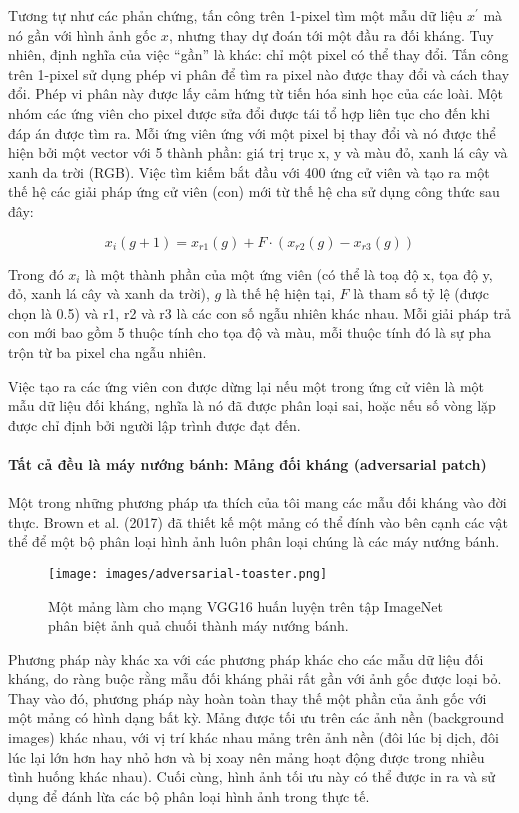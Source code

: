 Tương tự như các phản chứng, tấn công trên 1-pixel tìm một mẫu dữ liệu $x^\prime$ mà nó gần với hình ảnh gốc $x$, nhưng thay dự đoán tới một đầu ra đối kháng. Tuy nhiên, định nghĩa của việc ``gần'' là khác: chỉ một pixel có thể thay đổi. Tấn công trên 1-pixel sử dụng phép vi phân để tìm ra pixel nào được thay đổi và cách thay đổi. Phép vi phân này được lấy cảm hứng từ tiến hóa sinh học của các loài. Một nhóm các ứng viên cho pixel được sửa đổi được tái tổ hợp liên tục cho đến khi đáp án được tìm ra. Mỗi ứng viên ứng với một pixel bị thay đổi và nó được thể hiện bởi một vector với 5 thành phần: giá trị trục x, y và màu đỏ, xanh lá cây và xanh da trời (RGB). Việc tìm kiếm bắt đầu với 400 ứng cử viên và tạo ra một thế hệ các giải pháp ứng cử viên (con) mới từ thế hệ cha sử dụng công thức sau đây:

$$x_{i}(g+1)=x_{r1}(g)+F\cdot(x_{r2}(g)-x_{r3}(g))$$

Trong đó $x_i$ là một thành phần của một ứng viên (có thể là toạ độ x, tọa độ y, đỏ, xanh lá cây và xanh da trời), $g$ là thế hệ hiện tại, $F$ là tham số tỷ lệ (được chọn là 0.5) và r1, r2 và r3 là các con số ngẫu nhiên khác nhau. Mỗi giải pháp trả con mới bao gồm 5 thuộc tính cho tọa độ và màu, mỗi thuộc tính đó là sự pha trộn từ ba pixel cha ngẫu nhiên.

Việc tạo ra các ứng viên con được dừng lại nếu một trong ứng cử viên là một mẫu dữ liệu đối kháng, nghĩa là nó đã được phân loại sai, hoặc nếu số vòng lặp được chỉ định bởi người lập trình được đạt đến.

\paragraph{Tất cả đều là máy nướng bánh: Mảng đối kháng (adversarial patch)}

Một trong những phương pháp ưa thích của tôi mang các mẫu đối kháng vào đời thực. Brown et al. (2017) đã thiết kế một mảng có thể đính vào bên cạnh các vật thể để một bộ phân loại hình ảnh luôn phân loại chúng là các máy nướng bánh.


\begin{figure*}[h!]
	\centering
	\texttt{[image: images/adversarial-toaster.png]}
	\label{fig:6_5}
	\caption{Một mảng làm cho mạng VGG16 huấn luyện trên tập ImageNet phân biệt ảnh quả chuối thành máy nướng bánh.}
\end{figure*}

Phương pháp này khác xa với các phương pháp khác cho các mẫu dữ liệu đối kháng, do ràng buộc rằng mẫu đối kháng phải rất gần với ảnh gốc được loại bỏ. Thay vào đó, phương pháp này hoàn toàn thay thế một phần của ảnh gốc với một mảng có hình dạng bất kỳ. Mảng được tối ưu trên các ảnh nền (background images) khác nhau, với vị trí khác nhau mảng trên ảnh nền (đôi lúc bị dịch, đôi lúc lại lớn hơn hay nhỏ hơn và bị xoay nên mảng hoạt động được trong nhiều tình huống khác nhau). Cuối cùng, hình ảnh tối ưu này có thể được in ra và sử dụng để đánh lừa các bộ phân loại hình ảnh trong thực tế.

